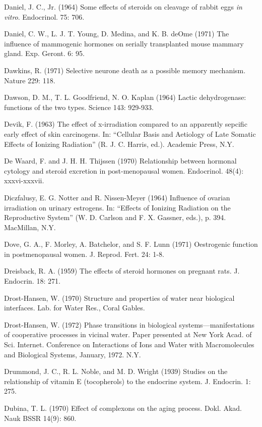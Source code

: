 Daniel, J. C., Jr. (1964) Some effects of steroids on cleavage of rabbit eggs \textit{in vitro}. Endocrinol. 75: 706.

Daniel, C. W., L. J. T. Young, D. Medina, and K. B. deOme (1971) The influence of mammogenic hormones on serially transplanted mouse mammary gland. Exp. Geront. 6: 95.

Dawkins, R. (1971) Selective neurone death as a possible memory mechanism. Nature 229: 118.

Dawson, D. M., T. L. Goodfriend, N. O. Kaplan (1964) Lactic dehydrogenase: functions of the two types. Science 143: 929-933.

Devik, F. (1963) The effect of x-irradiation compared to an apparently sepcific early effect of skin carcinogens. In: ``Cellular Basis and Aetiology of Late Somatic Effects of Ionizing Radiation'' (R. J. C. Harris, ed.). Academic Press, N.Y.

De Waard, F. and J. H. H. Thijssen (1970) Relationship between hormonal cytology and steroid excretion in post-menopausal women. Endocrinol. 48(4): xxxvi-xxxvii.


Diczfalusy, E. G. Notter and R. Nissen-Meyer (1964) Influence of ovarian irradiation on urinary estrogens. In: ``Effects of Ionizing Radiation on the Reproductive System'' (W. D. Carlson and F. X. Gassner, eds.), p. 394. MacMillan, N.Y.

Dove, G. A., F. Morley, A. Batchelor, and S. F. Lunn (1971) Oestrogenic function in postmenopausal women. J. Reprod. Fert. 24: 1-8.

Dreisback, R. A. (1959) The effects of steroid hormones on pregnant rats. J. Endocrin. 18: 271.

Drost-Hansen, W. (1970) Structure and properties of water near biological interfaces. Lab. for Water Res., Coral Gables.

Drost-Hansen, W. (1972) Phase transitions in biological systems---manifestations of cooperative processes in vicinal water. Paper presented at New York Acad. of Sci. Internet. Conference on Interactions of Ions and Water with Macromolecules and Biological Systems, January, 1972. N.Y.

Drummond, J. C., R. L. Noble, and M. D. Wright (1939) Studies on the relationship of vitamin E (tocopherols) to the endocrine system. J. Endocrin. 1: 275.

Dubina, T. L. (1970) Effect of complexons on the aging process. Dokl. Akad. Nauk BSSR 14(9): 860.

